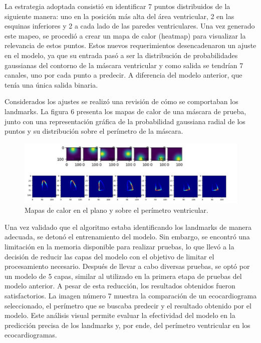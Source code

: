 \documentclass[runningheads]{llncs}
\begin{document}
La estrategia adoptada consistió en identificar 7 puntos distribuidos de la siguiente manera: uno en la posición más alta del área ventricular, 2 en las esquinas inferiores y 2 a cada lado de las paredes ventriculares. Una vez generado este mapeo, se procedió a crear un mapa de calor (heatmap) para visualizar la relevancia de estos puntos. Estos nuevos requerimientos desencadenaron un ajuste en el modelo, ya que su entrada pasó a ser la distribución de probabilidades gaussianas del contorno de la máscara ventricular y como salida se tendrían 7 canales, uno por cada punto a predecir. A diferencia del modelo anterior, que tenía una única salida binaria.

Considerados los ajustes se realizó una revisión de cómo se comportaban los landmarks. La figura 6 presenta los mapas de calor de una máscara de prueba, junto con una representación gráfica de la probabilidad gaussiana radial de los puntos y su distribución sobre el perímetro de la máscara.

\begin{figure}
    \centering
    \includegraphics[scale=1.5]{images/landmarks.png}
    \caption{Mapas de calor en el plano y sobre el perímetro ventricular.}\label{fig:imagen1}
\end{figure}

Una vez validado que el algoritmo estaba identificando los landmarks de manera adecuada, se detonó el entrenamiento del modelo. Sin embargo, se encontró una limitación en la memoria disponible para realizar pruebas, lo que llevó a la decisión de reducir las capas del modelo con el objetivo de limitar el procesamiento necesario. Después de llevar a cabo diversas pruebas, se optó por un modelo de 5 capas, similar al utilizado en la primera etapa de pruebas del modelo anterior. A pesar de esta reducción, los resultados obtenidos fueron satisfactorios. La imagen número 7 muestra la comparación de un ecocardiograma seleccionado, el perímetro que se buscaba predecir y el resultado obtenido por el modelo. Este análisis visual permite evaluar la efectividad del modelo en la predicción precisa de los landmarks y, por ende, del perímetro ventricular en los ecocardiogramas.
\end{document}
